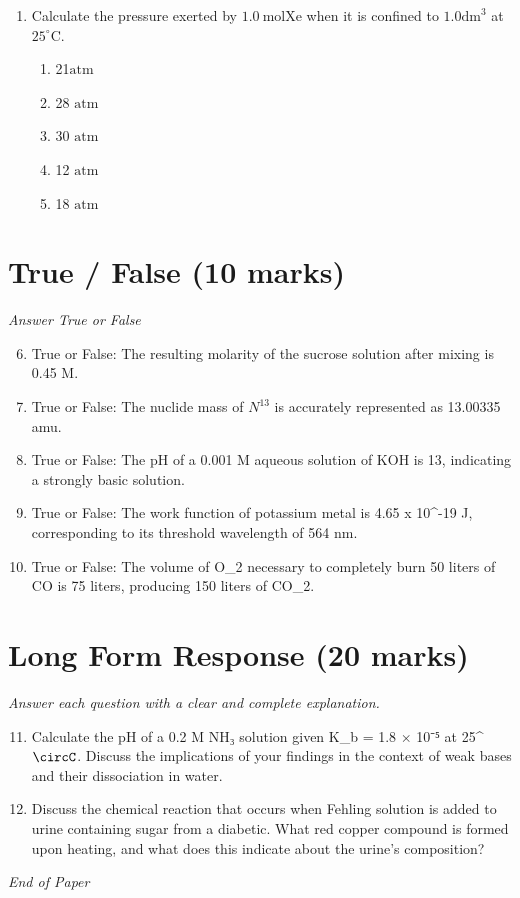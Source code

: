 \documentclass[12pt]{article}
\begin{document}
\begin{enumerate}[label=\arabic*.]
\begin{enumerate}[label=(\alph*)]
    \item -5/3, 4/2
    \item 5/3, -4/2
    \item 2, -10
    \item 4, -5
\end{enumerate}
\item Calculate the pressure exerted by $1.0 \mathrm{~mol} \mathrm{Xe}$ when it is confined to $1.0 \mathrm{dm}^3$ at $25^{\circ} \mathrm{C}$.
\begin{enumerate}[label=(\alph*)]
    \item 21$\mathrm{atm}$
    \item 28 $\mathrm{atm}$
    \item 30 $\mathrm{atm}$
    \item 12 $\mathrm{atm}$
    \item 18 $\mathrm{atm}$
\end{enumerate}
\end{enumerate}

\section*{True / False (10 marks)}
\textit{Answer True or False}
\begin{enumerate}[label=\arabic*.]
\setcounter{enumi}{5}
\item True or False: The resulting molarity of the sucrose solution after mixing is 0.45 M.
\item True or False: The nuclide mass of $N^13$ is accurately represented as 13.00335 amu.
\item True or False: The pH of a 0.001 M aqueous solution of KOH is 13, indicating a strongly basic solution.
\item True or False: The work function of potassium metal is 4.65 x 10^-19 J, corresponding to its threshold wavelength of 564 nm.
\item True or False: The volume of O\_2 necessary to completely burn 50 liters of CO is 75 liters, producing 150 liters of CO\_2.
\end{enumerate}

\section*{Long Form Response (20 marks)}
\textit{Answer each question with a clear and complete explanation.}
\begin{enumerate}[label=\arabic*.]
\setcounter{enumi}{10}
\item Calculate the pH of a 0.2 M NH₃ solution given K\_b = 1.8 \ensuremath{\times} 10⁻⁵ at 25^\ensuremath{\circC}. Discuss the implications of your findings in the context of weak bases and their dissociation in water.
\item Discuss the chemical reaction that occurs when Fehling solution is added to urine containing sugar from a diabetic. What red copper compound is formed upon heating, and what does this indicate about the urine's composition?
\end{enumerate}

\vfill
\noindent\textit{End of Paper}
\end{document}
